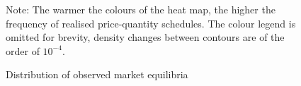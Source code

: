 \begin{subappendices}
\begin{figure}[H]
\begin{center}
\caption{Distribution of observed market equilibria}
\label{g7f}
\end{center}
{ \small Note: The warmer the colours of the heat map, the higher the frequency of realised price-quantity schedules. The colour legend is omitted for brevity, density changes between contours are of the order of $10^{-4}$.} 
\end{figure}

\label{statdes1}


\end{subappendices}
